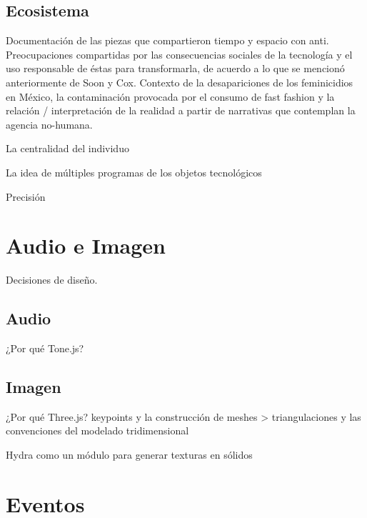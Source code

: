 \subsection{Ecosistema}

Documentación de las piezas que compartieron tiempo y espacio con anti. Preocupaciones compartidas por las consecuencias sociales de la tecnología y el uso responsable de éstas para transformarla, de acuerdo a lo que se mencionó anteriormente de Soon y Cox. Contexto de la desapariciones de los feminicidios en México, la contaminación provocada por el consumo de fast fashion y la relación / interpretación de la realidad a partir de narrativas que contemplan la agencia no-humana. 

La centralidad del individuo 

La idea de múltiples programas de los objetos tecnológicos \citep{latour}


Precisión 

\section{Audio e Imagen}

Decisiones de diseño.

\subsection{Audio}

¿Por qué Tone.js? 

\subsection{Imagen}

¿Por qué Three.js?
keypoints y la construcción de meshes > triangulaciones y las convenciones del modelado tridimensional 

Hydra como un módulo para generar texturas en sólidos 


\section{Eventos}

